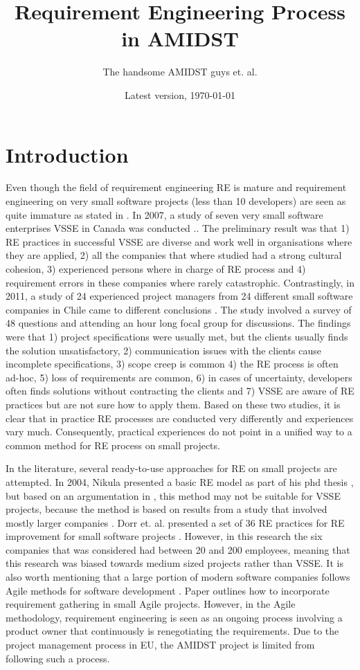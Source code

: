 \documentclass[11pt, oneside]{article}   	%
\title{Requirement Engineering Process in AMIDST}
\author{The handsome AMIDST guys et. al.}
\date{Latest version, \today}							%
\begin{document}
\maketitle
%
%
\section{Introduction}

Even though the field of requirement engineering RE is mature and requirement engineering on very small software projects (less than 10 developers) are seen as quite immature as stated in \cite{Qui10}. In 2007, a study of seven very small software enterprises VSSE in Canada was conducted \cite{Ara07}..  The preliminary result was that 1) RE practices in successful VSSE are diverse and work well in organisations where they are applied, 2) all the companies that where studied had a strong cultural cohesion, 3) experienced persons where in charge of RE process and 4) requirement errors in these companies where rarely catastrophic.  Contrastingly, in 2011, a study of 24 experienced project managers from 24 different small software companies in Chile came to different conclusions \cite{Qui10}.  The study involved a survey of 48 questions and attending an hour long focal group for discussions.  The findings were that 1) project specifications were usually met, but the clients usually finds the solution unsatisfactory, 2) communication issues with the clients cause incomplete specifications, 3) scope creep is common 4) the RE process is often ad-hoc, 5) loss of requirements are common, 6) in cases of uncertainty, developers often finds solutions without contracting the clients and 7) VSSE are aware of RE practices but are not sure how to apply them.  Based on these two studies, it is clear that in practice RE processes are conducted very differently and experiences vary much.  Consequently, practical experiences do not point in a unified way to a common method for RE process on small projects.

In the literature, several ready-to-use approaches for RE on small projects are attempted.  In 2004, Nikula presented a basic RE model as part of his phd thesis \cite{Nik04}, but based on an argumentation in \cite{Qui10}, this method may not be suitable for VSSE projects, because the method is based on results from a study that involved mostly larger companies \cite{Nik00}.   Dorr et. al. presented a set of 36 RE practices for RE improvement for small software projects \cite{Dor08}.  However, in this research the six companies that was considered had between 20 and 200 employees, meaning that this research was biased towards medium sized projects rather than VSSE. It is also worth mentioning that a large portion of modern software companies follows Agile methods for software development \cite{Din10}.  
Paper \cite{Kav11} outlines how to incorporate requirement gathering in small Agile projects.  However, in the Agile methodology, requirement engineering is seen as an ongoing process involving a product owner that continuously is renegotiating the requirements.  Due to the project management process in EU, the AMIDST project is limited from following such a process. 
\end{document}
